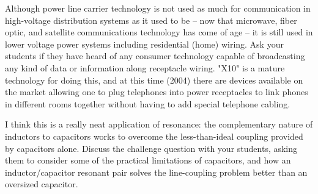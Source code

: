 Although power line carrier technology is not used as much for communication in high-voltage distribution systems as it used to be -- now that microwave, fiber optic, and satellite communications technology has come of age -- it is still used in lower voltage power systems including residential (home) wiring.  Ask your students if they have heard of any consumer technology capable of broadcasting any kind of data or information along receptacle wiring.  "X10" is a mature technology for doing this, and at this time (2004) there are devices available on the market allowing one to plug telephones into power receptacles to link phones in different rooms together without having to add special telephone cabling.

I think this is a really neat application of resonance: the complementary nature of inductors to capacitors works to overcome the less-than-ideal coupling provided by capacitors alone.  Discuss the challenge question with your students, asking them to consider some of the practical limitations of capacitors, and how an inductor/capacitor resonant pair solves the line-coupling problem better than an oversized capacitor.




